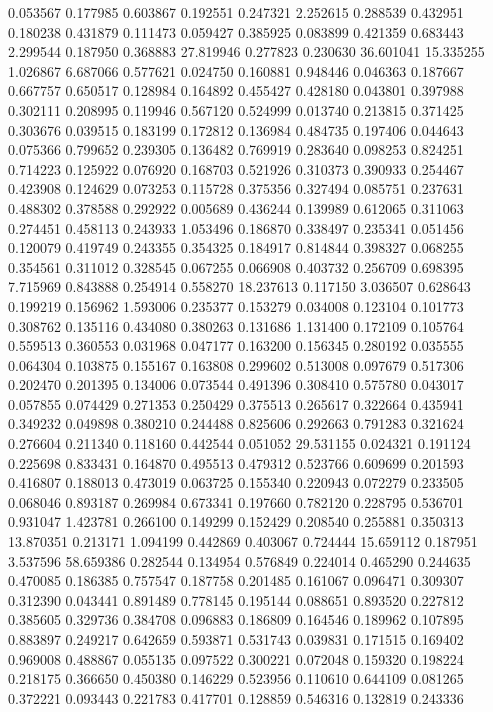 0.053567
0.177985
0.603867
0.192551
0.247321
2.252615
0.288539
0.432951
0.180238
0.431879
0.111473
0.059427
0.385925
0.083899
0.421359
0.683443
2.299544
0.187950
0.368883
27.819946
0.277823
0.230630
36.601041
15.335255
1.026867
6.687066
0.577621
0.024750
0.160881
0.948446
0.046363
0.187667
0.667757
0.650517
0.128984
0.164892
0.455427
0.428180
0.043801
0.397988
0.302111
0.208995
0.119946
0.567120
0.524999
0.013740
0.213815
0.371425
0.303676
0.039515
0.183199
0.172812
0.136984
0.484735
0.197406
0.044643
0.075366
0.799652
0.239305
0.136482
0.769919
0.283640
0.098253
0.824251
0.714223
0.125922
0.076920
0.168703
0.521926
0.310373
0.390933
0.254467
0.423908
0.124629
0.073253
0.115728
0.375356
0.327494
0.085751
0.237631
0.488302
0.378588
0.292922
0.005689
0.436244
0.139989
0.612065
0.311063
0.274451
0.458113
0.243933
1.053496
0.186870
0.338497
0.235341
0.051456
0.120079
0.419749
0.243355
0.354325
0.184917
0.814844
0.398327
0.068255
0.354561
0.311012
0.328545
0.067255
0.066908
0.403732
0.256709
0.698395
7.715969
0.843888
0.254914
0.558270
18.237613
0.117150
3.036507
0.628643
0.199219
0.156962
1.593006
0.235377
0.153279
0.034008
0.123104
0.101773
0.308762
0.135116
0.434080
0.380263
0.131686
1.131400
0.172109
0.105764
0.559513
0.360553
0.031968
0.047177
0.163200
0.156345
0.280192
0.035555
0.064304
0.103875
0.155167
0.163808
0.299602
0.513008
0.097679
0.517306
0.202470
0.201395
0.134006
0.073544
0.491396
0.308410
0.575780
0.043017
0.057855
0.074429
0.271353
0.250429
0.375513
0.265617
0.322664
0.435941
0.349232
0.049898
0.380210
0.244488
0.825606
0.292663
0.791283
0.321624
0.276604
0.211340
0.118160
0.442544
0.051052
29.531155
0.024321
0.191124
0.225698
0.833431
0.164870
0.495513
0.479312
0.523766
0.609699
0.201593
0.416807
0.188013
0.473019
0.063725
0.155340
0.220943
0.072279
0.233505
0.068046
0.893187
0.269984
0.673341
0.197660
0.782120
0.228795
0.536701
0.931047
1.423781
0.266100
0.149299
0.152429
0.208540
0.255881
0.350313
13.870351
0.213171
1.094199
0.442869
0.403067
0.724444
15.659112
0.187951
3.537596
58.659386
0.282544
0.134954
0.576849
0.224014
0.465290
0.244635
0.470085
0.186385
0.757547
0.187758
0.201485
0.161067
0.096471
0.309307
0.312390
0.043441
0.891489
0.778145
0.195144
0.088651
0.893520
0.227812
0.385605
0.329736
0.384708
0.096883
0.186809
0.164546
0.189962
0.107895
0.883897
0.249217
0.642659
0.593871
0.531743
0.039831
0.171515
0.169402
0.969008
0.488867
0.055135
0.097522
0.300221
0.072048
0.159320
0.198224
0.218175
0.366650
0.450380
0.146229
0.523956
0.110610
0.644109
0.081265
0.372221
0.093443
0.221783
0.417701
0.128859
0.546316
0.132819
0.243336
